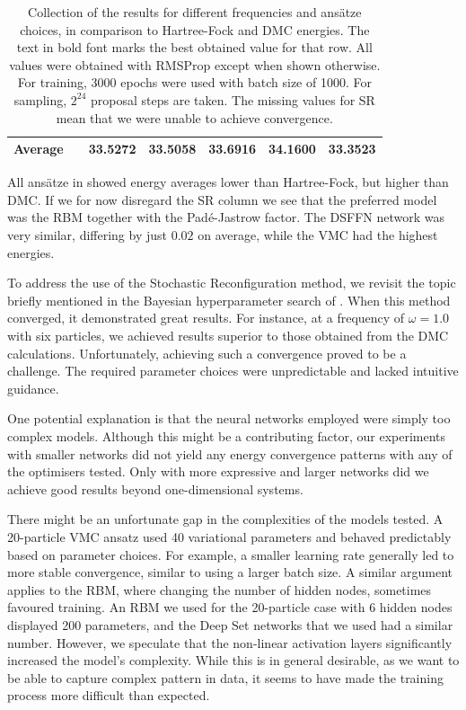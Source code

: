 \begin{table}[H]
\begin{tabular}{c|c|cc|c|c|c|c}
    \midrule
    \multicolumn{2}{c|}{\textbf{Average}}& & 33.5272 & 33.5058 & 33.6916 & 34.1600 & 33.3523 \\
    \bottomrule
    \end{tabular}
    \caption{Collection of the results for different frequencies and ansätze choices, in comparison to Hartree-Fock and DMC energies. The text in bold font marks the best obtained value for that row. All values were obtained with RMSProp except when shown otherwise. For training, 3000 epochs were used with batch size of 1000. For sampling, $2^{24}$ proposal steps are taken. The missing values for SR mean that we were unable to achieve convergence.}
    \label{tab:all_e_final2d}
\end{table}

All ansätze in  showed energy averages lower than Hartree-Fock, but higher than DMC. If we for now disregard the SR column we see that the preferred model was the RBM together with the Padé-Jastrow factor. The DSFFN network was very similar, differing by just $0.02$ on average, while the VMC had the highest energies. 

To address the use of the Stochastic Reconfiguration method, we revisit the topic briefly mentioned in the Bayesian hyperparameter search of . When this method converged, it demonstrated great results. For instance, at a frequency of $\omega = 1.0$ with six particles, we achieved results superior to those obtained from the DMC calculations. Unfortunately, achieving such a convergence proved to be a challenge. The required parameter choices were unpredictable and lacked intuitive guidance.

One potential explanation is that the neural networks employed were simply too complex models. Although this might be a contributing factor, our experiments with smaller networks did not yield any energy convergence patterns with any of the optimisers tested. Only with more expressive and larger networks did we achieve good results beyond one-dimensional systems.

There might be an unfortunate gap in the complexities of the models tested. A 20-particle VMC ansatz used 40 variational parameters and behaved predictably based on parameter choices. For example, a smaller learning rate generally led to more stable convergence, similar to using a larger batch size. A similar argument applies to the RBM, where changing the number of hidden nodes, sometimes favoured training. An RBM we used for the 20-particle case with 6 hidden nodes displayed 200 parameters, and the Deep Set networks that we used had a similar number. However, we speculate that the non-linear activation layers significantly increased the model's complexity. While this is in general desirable, as we want to be able to capture complex pattern in data, it seems to have made the training process more difficult than expected.

